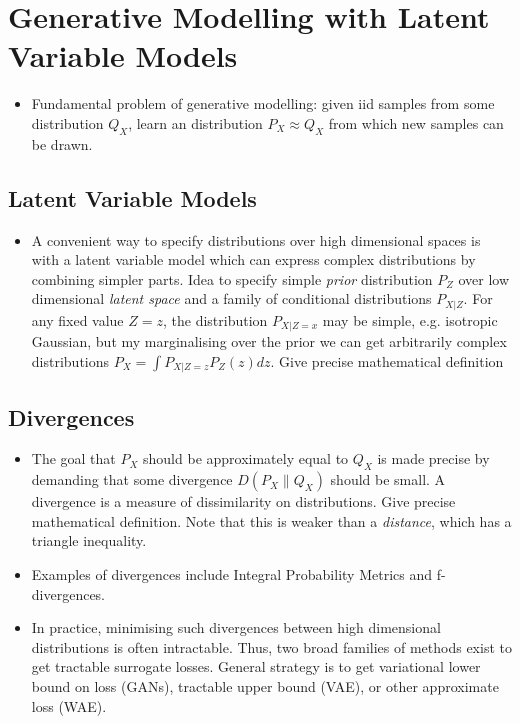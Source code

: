 \section{Generative Modelling with Latent Variable Models}


\begin{itemize}
\item Fundamental problem of generative modelling: given iid samples from some distribution $Q_X$, learn an distribution $P_X \approx Q_X$ from which new samples can be drawn. 
\end{itemize}


\subsection{Latent Variable Models}

\begin{itemize}
\item A convenient way to specify distributions over high dimensional spaces is with a latent variable model which can express complex distributions by combining simpler parts. Idea to specify simple \emph{prior} distribution $P_Z$ over low dimensional \emph{latent space} and a family of conditional distributions $P_{X|Z}$. For any fixed value $Z=z$, the distribution $P_{X|Z=x}$ may be simple, e.g. isotropic Gaussian, but my marginalising over the prior we can get arbitrarily complex distributions $P_X = \int P_{X|Z=z} P_Z(z) dz$. Give precise mathematical definition
\end{itemize}


\subsection{Divergences}

\begin{itemize}
\item The goal that $P_X$ should be approximately equal to $Q_X$ is made precise by demanding that some divergence $D(P_X \| Q_X)$ should be small. A divergence is a measure of dissimilarity on distributions. Give precise mathematical definition. Note that this is weaker than a \emph{distance}, which has a triangle inequality.
\item Examples of divergences include Integral Probability Metrics and f-divergences. 
\item In practice, minimising such divergences between high dimensional distributions is often intractable. Thus, two broad families of methods exist to get tractable surrogate losses. General strategy is to get variational lower bound on loss (GANs), tractable upper bound (VAE), or other approximate loss (WAE).
\end{itemize}


